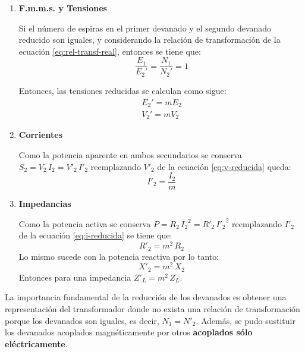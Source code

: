 \begin{enumerate}[label=\textbf{\alph*)}]
	\item \textbf{F.m.m.s. y Tensiones}
	
	Si el número de espiras en el primer devanado y el segundo devanado reducido son iguales, y considerando la relación de transformación de la ecuación \ref{eq:rel-transf-real}, entonces se tiene que:
	\begin{equation*}
		\dfrac{E_1}{E_2'} = \dfrac{N_1}{N_2'} = 1
	\end{equation*}

	Entonces, las tensiones reducidas se calculan como sigue:
	\begin{equation}
			\begin{split}
				E_2' = m E_2 \\
				V_2' = m V_2
			\end{split}
		\label{eq:v-reducida}
	\end{equation}
	
	\item \textbf{Corrientes}
	
	
	Como la potencia aparente en ambos secundarios se conserva $S_{2}=V_{2}\, I_{2}=V'_{2}\, I'_{2}$ reemplazando $V'_{2}$ de la ecuación \ref{eq:v-reducida} queda:
	\begin{equation}
		I'_{2}=\dfrac{I_{2}}{m}
		\label{eq:i-reducida}
	\end{equation}


	\item \textbf{Impedancias}
	
	
	Como la potencia activa se conserva $P = R_{2}\, {I_{2}}^{2} = R'_{2} \, {I'_{2}}^{2}$ reemplazando $I'_{2}$ de la ecuación \ref{eq:i-reducida} se tiene que:
	\begin{equation}
		R'_{2}=m^{2}\, R_{2}
	\end{equation}
	Lo mismo sucede con la potencia reactiva por lo tanto:
	\begin{equation}
		X'_{2}=m^{2}\, X_{2}
	\end{equation}
	Entonces para una impedancia $Z'_{L}=m^{2}\, Z_{L}$.
\end{enumerate}

La importancia fundamental de la reducción de los devanados es obtener una representación del transformador donde no exista una relación de transformación porque los devanados son iguales, es decir, $N_{1}=N'_{2}$. Además, se pudo sustituir los devanados acoplados magnéticamente por otros \textbf{acoplados sólo eléctricamente}.
